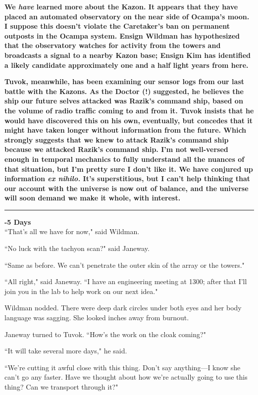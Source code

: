 \documentclass[twoside,letterpaper,12pt]{memoir}
\begin{document}
\textbf{We \textit{have} learned more about the Kazon. It appears that they have placed an automated observatory on the near side of Ocampa's moon. I suppose this doesn't violate the Caretaker's ban on permanent outposts in the Ocampa system. Ensign Wildman has hypothesized that the observatory watches for activity from the towers and broadcasts a signal to a nearby Kazon base; Ensign Kim has identified a likely candidate approximately one and a half light years from here. }

\textbf{Tuvok, meanwhile, has been examining our sensor logs from our last battle with the Kazons. As the Doctor (!) suggested, he believes the ship our future selves attacked was Razik's command ship, based on the volume of radio traffic coming to and from it. Tuvok insists that he would have discovered this on his own, eventually, but concedes that it might have taken longer without information from the future. Which strongly suggests that we knew to attack Razik's command ship because we attacked Razik's command ship. I'm not well-versed enough in temporal mechanics to fully understand all the nuances of that situation, but I'm pretty sure I don't like it. We have conjured up information \textit{ex nihilo.}
It's superstitious, but I can't help thinking that our account with the universe is now out of balance, and the universe will soon demand we make it whole, with interest.} 

\begin{center}\rule{3cm}{0.4 pt}\end{center} 

\noindent\textbf{-5 Days} \\

``That's all we have for now," said Wildman. 

``No luck with the tachyon scan?" said Janeway. 

``Same as before. We can't penetrate the outer skin of the array or the towers." 

``All right," said Janeway. ``I have an engineering meeting at 1300; after that I'll join you in the lab to help work on our next idea." 

Wildman nodded. There were deep dark circles under both eyes and her body language was sagging. She looked inches away from burnout. 

Janeway turned to Tuvok. ``How's the work on the cloak coming?" 

``It will take several more days," he said. 

``We're cutting it awful close with this thing. Don't say anything---I know she can't go any faster. Have we thought about how we're actually going to use this thing? Can we transport through it?" 
\end{document}
